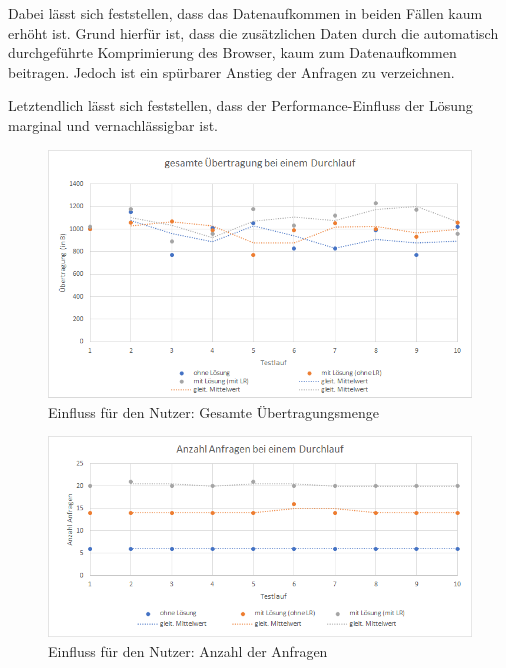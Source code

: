 Dabei lässt sich feststellen, dass das Datenaufkommen in beiden Fällen kaum erhöht ist. Grund hierfür ist, dass die zusätzlichen Daten durch die automatisch durchgeführte Komprimierung\footnotemark{} des Browser, kaum zum Datenaufkommen beitragen. Jedoch ist ein spürbarer Anstieg der Anfragen zu verzeichnen.

Letztendlich lässt sich feststellen, dass der Performance-Einfluss der Lösung marginal und vernachlässigbar ist.


\begin{figure}[H]
	\centering
	\includegraphics[width=1.00\linewidth]{data/Einfluss-fuer-den-Nutzer/Einfluss-fuer-den-Nutzer_gesamte-Uebertragung.png}
	\caption{Einfluss für den Nutzer: Gesamte Übertragungsmenge}
	\label{fig:Einfluss-fuer-den-Nutzer_gesamte-Uebertragung}
\end{figure}

\begin{figure}[H]
	\centering
	\includegraphics[width=1.00\linewidth]{data/Einfluss-fuer-den-Nutzer/Einfluss-fuer-den-Nutzer_Anzahl-Anfragen.png}
	\caption{Einfluss für den Nutzer: Anzahl der Anfragen}
	\label{fig:Einfluss-fuer-den-Nutzer_Anzahl-Anfragen}
\end{figure}
